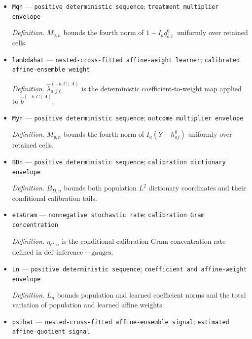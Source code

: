 \documentclass{article}
\begin{document}
\begin{itemize}
  \par\smallskip\noindent\emph{Definition.} The coefficient is zero below the calibration cutoff \(\tau_n\) and equals \((\widehat\gamma+\rho_n)^{-1}\) times the cross-moment coordinate on each retained calibration eigenvector.
  \item \texttt{Mqn} --- \texttt{positive deterministic sequence}; \texttt{treatment multiplier envelope}
  \par\smallskip\noindent\emph{Definition.} \(M_{q,n}\) bounds the fourth norm of \(1-I_aq^0_{a\ell}\) uniformly over retained cells.
  \item \texttt{lambdahat} --- \texttt{nested-\allowbreak{}cross-\allowbreak{}fitted affine-\allowbreak{}weight learner}; \texttt{calibrated affine-\allowbreak{}ensemble weight}
  \par\smallskip\noindent\emph{Definition.} \(\widehat\lambda_{a,j\ell}^{(-k,C\mid A)}\) is the deterministic coefficient-to-weight map applied to \(\widehat b^{(-k,C\mid A)}\).
  \item \texttt{Myn} --- \texttt{positive deterministic sequence}; \texttt{outcome multiplier envelope}
  \par\smallskip\noindent\emph{Definition.} \(M_{y,n}\) bounds the fourth norm of \(I_a(Y-h^0_{aj})\) uniformly over retained cells.
  \item \texttt{BDn} --- \texttt{positive deterministic sequence}; \texttt{calibration dictionary envelope}
  \par\smallskip\noindent\emph{Definition.} \(B_{D,n}\) bounds both population \(L^2\) dictionary coordinates and their conditional calibration tails.
  \item \texttt{etaGram} --- \texttt{nonnegative stochastic rate}; \texttt{calibration Gram concentration}
  \par\smallskip\noindent\emph{Definition.} \(\eta_{G,n}\) is the conditional calibration Gram concentration rate defined in \(\mathrm{def:inference-gauges}\).
  \item \texttt{Ln} --- \texttt{positive deterministic sequence}; \texttt{coefficient and affine-\allowbreak{}weight envelope}
  \par\smallskip\noindent\emph{Definition.} \(L_n\) bounds population and learned coefficient norms and the total variation of population and learned affine weights.
  \item \texttt{psihat} --- \texttt{nested-\allowbreak{}cross-\allowbreak{}fitted affine-\allowbreak{}ensemble signal}; \texttt{estimated affine-\allowbreak{}quotient signal}

\end{itemize}
\end{document}
